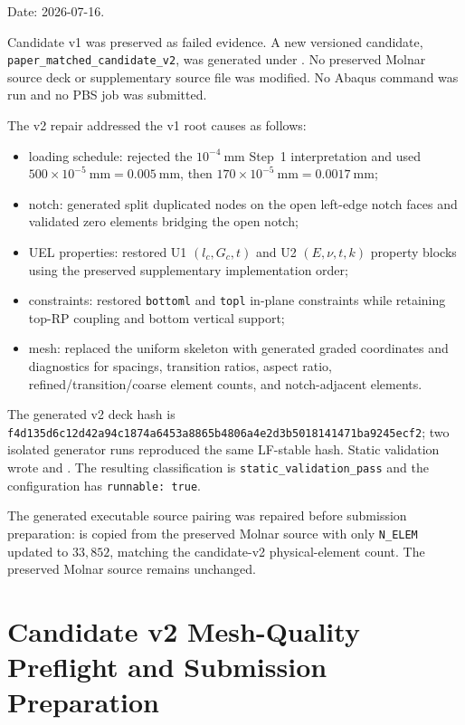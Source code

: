 \documentclass[11pt,a4paper]{article}
\begin{document}
Date: 2026-07-16.

Candidate v1 was preserved as failed evidence. A new versioned candidate, \texttt{paper\_matched\_candidate\_v2}, was generated under . No preserved Molnar source deck or supplementary source file was modified. No Abaqus command was run and no PBS job was submitted.

The v2 repair addressed the v1 root causes as follows:
\begin{itemize}
  \item loading schedule: rejected the \(10^{-4}\ \mathrm{mm}\) Step~1 interpretation and used \(500\times10^{-5}\ \mathrm{mm}=0.005\ \mathrm{mm}\), then \(170\times10^{-5}\ \mathrm{mm}=0.0017\ \mathrm{mm}\);
  \item notch: generated split duplicated nodes on the open left-edge notch faces and validated zero elements bridging the open notch;
  \item UEL properties: restored U1 \((l_c,G_c,t)\) and U2 \((E,\nu,t,k)\) property blocks using the preserved supplementary implementation order;
  \item constraints: restored \texttt{bottoml} and \texttt{topl} in-plane constraints while retaining top-RP coupling and bottom vertical support;
  \item mesh: replaced the uniform skeleton with generated graded coordinates and diagnostics for spacings, transition ratios, aspect ratio, refined/transition/coarse element counts, and notch-adjacent elements.
\end{itemize}

The generated v2 deck hash is \texttt{f4d135d6c12d42a94c1874a6453a8865b4806a4e2d3b5018141471ba9245ecf2}; two isolated generator runs reproduced the same LF-stable hash. Static validation wrote  and . The resulting classification is \texttt{static\_validation\_pass} and the configuration has \texttt{runnable: true}.

The generated executable source pairing was repaired before submission preparation:  is copied from the preserved Molnar source with only \texttt{N\_ELEM} updated to \(33{,}852\), matching the candidate-v2 physical-element count. The preserved Molnar source remains unchanged.

\section{Candidate v2 Mesh-Quality Preflight and Submission Preparation}
\end{document}
